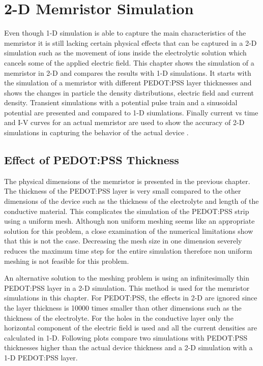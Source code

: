 
\chapter{2-D Memristor Simulation} %

\label{Chapter6} %

\begin{doublespace}

Even though 1-D simulation is able to capture the main characteristics of the memristor it is still lacking certain physical effects that can be captured in a 2-D simulation such as the movement of ions inside the electrolytic solution which cancels some of the applied electric field. This chapter shows the simulation of a memristor in 2-D and compares the results with 1-D simulations. It starts with the simulation of a memristor with different PEDOT:PSS layer thicknesses and shows the changes in particle the density distributions, electric field and current density. Transient simulations with a potential pulse train and a sinusoidal potential are presented and compared to 1-D siumlations. Finally current vs time and I-V curves for an actual memristor are used to show the accuracy of 2-D simulations in capturing the behavior of the actual device .  

\section{Effect of PEDOT:PSS Thickness}

The physical dimensions of the memristor is presented in the previous chapter. The thickness of the PEDOT:PSS layer is very small compared to the other dimensions of the device such as the thickness of the electrolyte and length of the conductive material. This complicates the simulation of the PEDOT:PSS strip using a uniform mesh. Although non uniform meshing seems like an appropriate solution for this problem, a close examination of the numerical limitations show that this is not the case. Decreasing the mesh size in one dimension severely reduces the maximum time step for the entire simulation therefore non uniform meshing is not feasible for this problem. 

An alternative solution to the meshing problem is using an infinitesimally thin PEDOT:PSS layer in a 2-D simulation. This method is used for the memristor simulations in this chapter. For PEDOT:PSS, the effects in 2-D are ignored since the layer thickness is 10000 times smaller than other dimensions such as the thickness of the electrolyte. For the holes in the conductive layer only the horizontal component of the electric field is used and all the current densities are calculated in 1-D. Following plots compare two simulations with PEDOT:PSS thicknesses higher than the actual device thickness and a 2-D simulation with a 1-D PEDOT:PSS layer.  


\end{doublespace}
